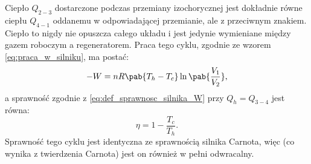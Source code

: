 Ciepło \(Q_{2-3}\) dostarczone podczas przemiany izochorycznej jest dokładnie równe ciepłu \(Q_{4-1}\) oddanemu w odpowiadającej przemianie, ale z przeciwnym znakiem. Ciepło to nigdy nie opuszcza całego układu i jest jedynie wymieniane między gazem roboczym a regeneratorem. Praca tego cyklu, zgodnie ze wzorem \eqref{eq:praca_w_silniku}, ma postać:
\begin{equation}
	- W = n R \pab{T_h - T_c} \ln\pab{\frac{V_1}{V_2}},
\end{equation}
a sprawność zgodnie z \eqref{eq:def_sprawnosc_silnika_W} przy \(Q_h = Q_{3-4}\) jest równa:
\begin{equation}
	\eta = 1 - \frac{T_c}{T_h}.
\end{equation}
Sprawność tego cyklu jest identyczna ze sprawnością silnika Carnota, więc (co wynika z twierdzenia Carnota) jest on również w pełni odwracalny.